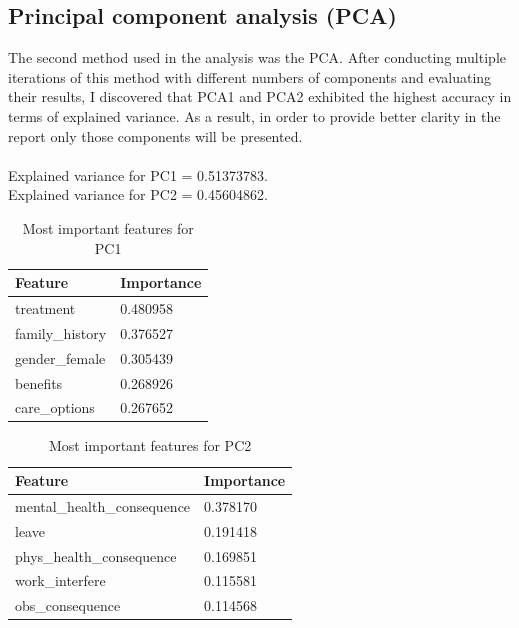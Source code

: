 \documentclass[conference]{IEEEtran}
\begin{document}
\subsection{Principal component analysis (PCA)}
The second method used in the analysis was the PCA. After conducting multiple iterations of this method with different numbers of components and evaluating their results, I discovered that PCA1 and PCA2 exhibited the highest accuracy in terms of explained variance. As a result, in order to provide better clarity in the report only those components will be presented.\\
\vspace{0.2cm}\\
Explained variance for PC1 = 0.51373783.\\
Explained variance for PC2 = 0.45604862.

\begin{table}[h]
\centering
\begin{tabular}{|l|l|}
\hline
\textbf{Feature} & \textbf{Importance} \\ \hline
treatment        & 0.480958            \\ \hline
family\_history   & 0.376527            \\ \hline
gender\_female    & 0.305439            \\ \hline
benefits         & 0.268926            \\ \hline
care\_options     & 0.267652            \\ \hline
\end{tabular}
\caption{Most important features for PC1}
\label{tab:pc1}
\end{table}

\begin{table}[h]
\centering
\begin{tabular}{|l|l|}
\hline
\textbf{Feature}            & \textbf{Importance} \\ \hline
mental\_health\_consequence & 0.378170            \\ \hline
leave                       & 0.191418            \\ \hline
phys\_health\_consequence   & 0.169851            \\ \hline
work\_interfere             & 0.115581            \\ \hline
obs\_consequence            & 0.114568            \\ \hline
\end{tabular}
\caption{Most important features for PC2}
\label{tab:pc2}
\end{table}
\end{document}
